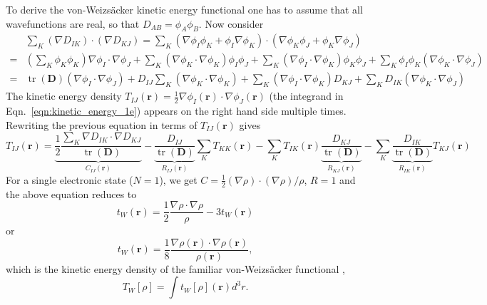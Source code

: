 \documentclass[journal=jacsat,manuscript=article]{achemso}
\DeclareMathOperator{\tr}{tr}
\newcommand\m[1]{\mathbf{#1}}
\renewcommand\vec[1]{\mathbf{#1}}
\begin{document}
To derive the von-Weizs\"{a}cker kinetic energy functional one has to assume that all wavefunctions are real, so that $D_{AB} = \phi_A \phi_B$.
Now consider
\begin{equation}
\begin{split}
  & \sum_K (\nabla D_{IK}) \cdot (\nabla D_{KJ})
  = \sum_K (\nabla \phi_I \phi_K + \phi_I \nabla \phi_K)\cdot (\nabla \phi_K \phi_J + \phi_K \nabla \phi_J) \\
  =&
  (\sum_K \phi_K \phi_K) \nabla \phi_I \cdot \nabla \phi_J +
  \sum_K (\nabla \phi_K \cdot \nabla \phi_K) \phi_I \phi_J +
  \sum_K (\nabla \phi_I \cdot \nabla \phi_K) \phi_K \phi_J +
  \sum_K \phi_I \phi_K (\nabla \phi_K \cdot  \nabla \phi_J) \\
  =& \tr(\m{D}) (\nabla \phi_I \cdot \nabla \phi_J) + D_{IJ} \sum_{K} (\nabla \phi_K \cdot \nabla \phi_K) + \sum_K (\nabla \phi_I \cdot \nabla \phi_K) D_{KJ}
  + \sum_K D_{IK} (\nabla \phi_K \cdot \nabla \phi_J)
\end{split}
\end{equation}
The kinetic energy density $T_{IJ}(\vec{r}) = \frac{1}{2} \nabla \phi_I(\vec{r}) \cdot \nabla \phi_J(\vec{r})$ (the integrand in Eqn.~\ref{eqn:kinetic_energy_1e}) appears on the right hand side multiple times. Rewriting the previous equation in terms of $T_{IJ}(\vec{r})$ gives
\begin{equation}
T_{IJ}(\vec{r}) = \underbrace{\frac{1}{2} \frac{\sum_K \nabla D_{IK} \cdot \nabla D_{KJ}}{\tr(\m{D})}}_{C_{IJ}(\vec{r})} - \underbrace{\frac{D_{IJ}}{\tr(\m{D})}}_{R_{IJ}(\vec{r})} \sum_K T_{KK}(\vec{r}) - \sum_{K} T_{IK}(\vec{r}) \underbrace{\frac{D_{KJ}}{\tr(\m{D})}}_{R_{KJ}(\vec{r})} - \sum_{K} \underbrace{\frac{D_{IK}}{\tr(\m{D})}}_{R_{IK}(\vec{r})} T_{KJ}(\vec{r}) \label{eqn:kinetic_density_multistate}
\end{equation}
For a single electronic state ($N=1$), we get $C = \frac{1}{2} (\nabla \rho)\cdot (\nabla \rho) / \rho$, $R = 1$ and the above equation reduces to
\begin{equation}
t_W(\vec{r}) = \frac{1}{2} \frac{\nabla \rho \cdot \nabla \rho}{\rho} - 3 t_W(\vec{r})
\end{equation}
or
\begin{equation}
t_W(\vec{r}) = \frac{1}{8} \frac{\nabla \rho(\vec{r}) \cdot \nabla \rho(\vec{r})}{\rho(\vec{r})}, \label{eqn:von_Weizsaecker_ked}
\end{equation}
which is the kinetic energy density of the familiar von-Weizs\"{a}cker functional \cite{Weizsacker1935},
\begin{equation}
  T_W[\rho] = \int t_W[\rho](\vec{r}) d^3\!r  \label{eqn:von_Weizsaecker_functional}.
\end{equation}
\end{document}
